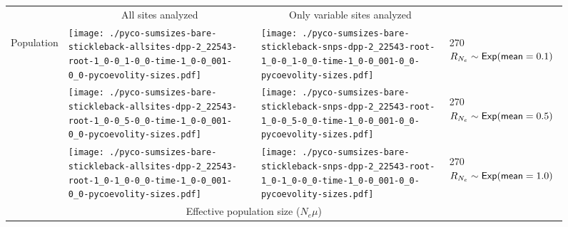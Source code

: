 \documentclass[border=10pt,varwidth=30cm]{standalone}
\begin{document}
\begin{figure}
    \centering
    \begin{tabular}{@{}llll@{}}
        & \multicolumn{1}{c}{\large All sites analyzed} & \multicolumn{1}{c}{\large Only variable sites analyzed} & \\[1ex]
        \multirow{2}{*}[-4em]{\begin{sideways}\large Population\end{sideways}}
        & \texttt{[image: ./pyco-sumsizes-bare-stickleback-allsites-dpp-2\_22543-root-1\_0-0\_1-0\_0-time-1\_0-0\_001-0\_0-pycoevolity-sizes.pdf]}
        & \texttt{[image: ./pyco-sumsizes-bare-stickleback-snps-dpp-2\_22543-root-1\_0-0\_1-0\_0-time-1\_0-0\_001-0\_0-pycoevolity-sizes.pdf]}
        & \multirow{1}{*}[11em]{\begin{rotate}{270}$R_{N_e} \sim \textrm{\sffamily Exp}(\textrm{\sffamily mean}=0.1)$\end{rotate}} \\
        & \texttt{[image: ./pyco-sumsizes-bare-stickleback-allsites-dpp-2\_22543-root-1\_0-0\_5-0\_0-time-1\_0-0\_001-0\_0-pycoevolity-sizes.pdf]}
        & \texttt{[image: ./pyco-sumsizes-bare-stickleback-snps-dpp-2\_22543-root-1\_0-0\_5-0\_0-time-1\_0-0\_001-0\_0-pycoevolity-sizes.pdf]}
        & \multirow{1}{*}[11em]{\begin{rotate}{270}$R_{N_e} \sim \textrm{\sffamily Exp}(\textrm{\sffamily mean}=0.5)$\end{rotate}} \\
        & \texttt{[image: ./pyco-sumsizes-bare-stickleback-allsites-dpp-2\_22543-root-1\_0-1\_0-0\_0-time-1\_0-0\_001-0\_0-pycoevolity-sizes.pdf]}
        & \texttt{[image: ./pyco-sumsizes-bare-stickleback-snps-dpp-2\_22543-root-1\_0-1\_0-0\_0-time-1\_0-0\_001-0\_0-pycoevolity-sizes.pdf]}
        & \multirow{1}{*}[11em]{\begin{rotate}{270}$R_{N_e} \sim \textrm{\sffamily Exp}(\textrm{\sffamily mean}=1.0)$\end{rotate}} \\
        & \multicolumn{2}{c}{\large Effective population size ($N_e\mu$)} & 
    \end{tabular}
\end{figure}
\end{document}

